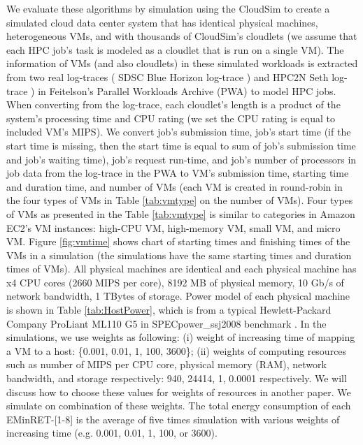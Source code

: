 We evaluate these algorithms by simulation using the CloudSim \cite{Cloudsim} to create a simulated
 cloud data center system that has identical physical machines, heterogeneous VMs,
 and with thousands of CloudSim's cloudlets \cite{Cloudsim} (we assume that each
HPC job's task is modeled as a cloudlet that is run on a single VM). 
The information of VMs (and also cloudlets) in these simulated workloads 
is extracted from two real log-traces ( SDSC Blue Horizon log-trace \cite{SDSCBLUEWorkload}) and 
HPC2N Seth log-trace \cite{HPC2NWorkload}) 
in Feitelson's Parallel Workloads Archive (PWA) \cite{PWA} to 
model HPC jobs. When converting from the 
log-trace, each cloudlet's length is a product of the system's 
processing time and CPU rating (we set the CPU rating is equal to included VM's MIPS).
 We convert job's submission time, job's start time (if the start time is missing, then the start time is equal to sum of job's submission time and job's waiting time), 
 job's request run-time, 
 and job's number of processors 
in job data from the log-trace in the PWA
 to VM's submission time, starting time and duration time, 
 and number of VMs (each VM is created in round-robin in the four types of VMs in Table \ref{tab:vmtype} on the number of VMs). 
 Four types of VMs as presented in the Table \ref{tab:vmtype} is similar to categories in Amazon EC2's 
 VM instances: high-CPU VM, high-memory VM, small VM, and micro VM. 
 Figure \ref{fig:vmtime} shows chart of starting times and finishing times
 of the VMs in a simulation (the simulations have the same starting times and duration times of VMs).
 All physical machines are identical and each physical machine has x4 CPU cores (2660 MIPS per core),
 8192 MB of physical memory, 10 Gb/s of network bandwidth, 1 TBytes of storage.
 Power model of each physical machine is shown in Table \ref{tab:HostPower},
 which is from a typical Hewlett-Packard Company ProLiant ML110 G5 in SPECpower\_ssj2008 benchmark \cite{HPProliantG5PowerModel}.
In the simulations, we use weights as following:
(i) weight of increasing time of mapping a VM to a host: \{0.001, 0.01, 1, 100, 3600\};
(ii) weights of computing resources such as number of MIPS per CPU core, physical memory (RAM), network bandwidth, and storage respectively: 940, 24414, 1, 0.0001 respectively. 
We will discuss how to choose these values for weights of resources in another paper. 
We simulate on combination of these weights. 
The total energy consumption of each EMinRET-[1-8] is the average of five times simulation with various weights of increasing time (e.g. 0.001, 0.01, 1, 100, or 3600).


